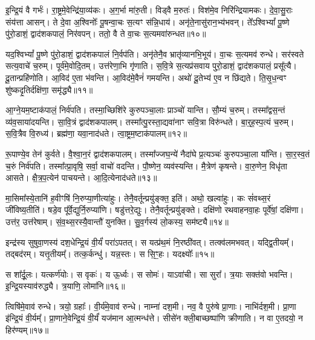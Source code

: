 इ॒न्द्रि॒यं वै गर्भः॑।
रा॒ष्ट्रमे॒वेन्द्रि॑या॒व्य॑कः।
अ॒ग॒र्भा मा॑रु॒ती।
विड्वै म॒रुतः॑।
विश॑मे॒व निरि॑न्द्रियामकः।
दे॒वा॒सु॒राः संय॑त्ता आसन्।
ते दे॒वा अ॒श्विनोः᳚ पू॒षन्वा॒चः स॒त्यꣳ स॑न्नि॒धाय॑।
अनृ॑ते॒नासु॑रान॒भ्य॑भवन्।
ते᳚ऽश्विभ्यां᳚ पू॒ष्णे पु॑रो॒डाशं॒ द्वाद॑शकपालं॒ निर॑वपन्।
ततो॒ वै ते वा॒चः स॒त्यमवा॑रुन्धत॥१०॥\ip

यद॒श्विभ्यां᳚ पू॒ष्णे पु॑रो॒डाशं॒ द्वाद॑शकपालं नि॒र्वप॑ति।
अनृ॑तेनै॒व भ्रातृ॑व्यानभि॒भूय॑।
वा॒चः स॒त्यमव॑ रुन्धे।
सर॑स्वते सत्य॒वाचे॑ च॒रुम्।
पूर्व॑मे॒वोदि॒तम्।
उत्त॑रेणा॒भि गृ॑णाति।
स॒वि॒त्रे स॒त्यप्र॑सवाय पुरो॒डाशं॒ द्वाद॑शकपालं॒ प्रसू᳚त्यै।
दू॒तान्प्रहि॑णोति।
आ॒विद॑ ए॒ता भ॑वन्ति।
आ॒विद॑मे॒वैनं॑ गमयन्ति।
अथो॑ दू॒तेभ्य॑ ए॒व न छि॑द्यते।
ति॒सृ॒ध॒न्वꣳ शु॑ष्कदृ॒तिर्दक्षि॑णा॒ समृ॑द्ध्यै॥११॥\ip\anuvakamend[अ॒र्ध॒य॒ति॒ भ॒व॒त्य॒रु॒न्ध॒त॒ ग॒म॒य॒न्ति॒ द्वे च॑]

आ॒ग्ने॒यम॒ष्टा\-क॑पालं॒ निर्व॑पति।
तस्मा॒च्छिशि॑रे कुरुपञ्चा॒लाः प्राञ्चो॑ यान्ति।
सौ॒म्यं च॒रुम्।
तस्मा᳚द्वस॒न्तं व्य॑व॒साया॑दयन्ति।
सा॒वि॒त्रं द्वाद॑शकपालम्।
तस्मा᳚त्पु॒रस्ता॒द्यवा॑नाꣳ सवि॒त्रा विरु॑न्धते।
बा॒र्॒ह॒स्प॒त्यं च॒रुम्।
स॒वि॒त्रैव वि॒रुध्य॑।
ब्रह्म॑णा॒ यवा॒नाद॑धते।
त्वा॒ष्ट्रम॒ष्टा\-क॑पालम्॥१२॥\ip

रू॒पाण्ये॒व तेन॑ कुर्वते।
वै॒श्वा॒न॒रं द्वाद॑शकपालम्।
तस्मा᳚ज्जघ॒न्ये॑ नैदा॑घे प्र॒त्यञ्चः॑ कुरुपञ्चा॒ला या᳚न्ति।
सा॒र॒स्व॒तं च॒रुं निर्व॑पति।
तस्मा᳚त्प्रा॒वृषि॒ सर्वा॒ वाचो॑ वदन्ति।
पौ॒ष्णेन॒ व्यव॑स्यन्ति।
मै॒त्रेण॑ कृषन्ते।
वा॒रु॒णेन॒ विधृ॑ता आसते।
क्षै॒त्र॒प॒त्येन॑ पाचयन्ते।
आ॒दि॒त्येनाद॑धते॥१३॥\ip

मा॒सिमा᳚स्ये॒तानि॑ ह॒वीꣳषि॑ नि॒रुप्या॒णीत्या॑हुः।
तेनै॒वर्तून्प्रयु॑ङ्क्त॒ इति॑।
अथो॒ खल्वा॑हुः।
कः सं॑वथ्स॒रं जी॑विष्य॒तीति॑।
षडे॒व पू᳚र्वे॒द्युर्नि॒रुप्या॑णि।
षडु॑त्तरे॒द्युः।
तेनै॒वर्तून्प्रयु॑ङ्क्ते।
दक्षि॑णो रथवाहनवा॒हः पूर्वे॑षां॒ दक्षि॑णा।
उत्त॑र॒ उत्त॑रेषाम्।
सं॒व॒थ्स॒रस्यै॒वान्तौ॑ युनक्ति।
सु॒व॒र्गस्य॑ लो॒कस्य॒ सम॑ष्ट्यै॥१४॥\ip\anuvakamend[त्वा॒ष्ट्रम॒ष्टा\-क॑पालं दधते युन॒क्त्येकं॑ च]

इन्द्र॑स्य सुषुवा॒णस्य॑ दश॒धेन्द्रि॒यं वी॒र्यं॑ परा॑\-ऽपतत्।
स यत्प्र॑थ॒मं नि॒रष्ठी॑वत्।
तत्क्व॑लमभवत्।
यद्द्वि॒तीयम्᳚।
तद्बद॑रम्।
यत्तृ॒तीयम्᳚।
तत्क॒र्कन्धु॑।
यन्न॒स्तः।
स सि॒ꣳ॒हः।
यदक्ष्योः᳚॥१५॥\ip

स शा᳚र्दू॒लः।
यत्कर्ण॑योः।
स वृकः॑।
य ऊ॒र्ध्वः।
स सोमः॑।
याऽवा॑ची।
सा सुरा᳚।
त्र॒याः सक्त॑वो भवन्ति।
इ॒न्द्रि॒यस्या\-व॑\-रुद्ध्यै।
त्र॒याणि॒ लोमा॑नि॥१६॥\ip

त्विषि॑मे॒वाव॑ रुन्धे।
त्रयो॒ ग्रहाः᳚।
वी॒र्य॑मे॒वाव॑ रुन्धे।
नाम्ना॑ दश॒मी।
नव॒ वै पुरु॑षे प्रा॒णाः।
नाभि॑र्दश॒मी।
प्रा॒णा इ॑न्द्रि॒यं वी॒र्यम्᳚।
प्रा॒णाने॒वेन्द्रि॒यं वी॒र्यं॑ यज॑मान आ॒त्मन्ध॑त्ते।
सीसे॑न क्ली॒बाच्छष्पा॑णि क्रीणाति।
न वा ए॒तदयो॒ न हिर॑ण्यम्॥१७॥\ip

